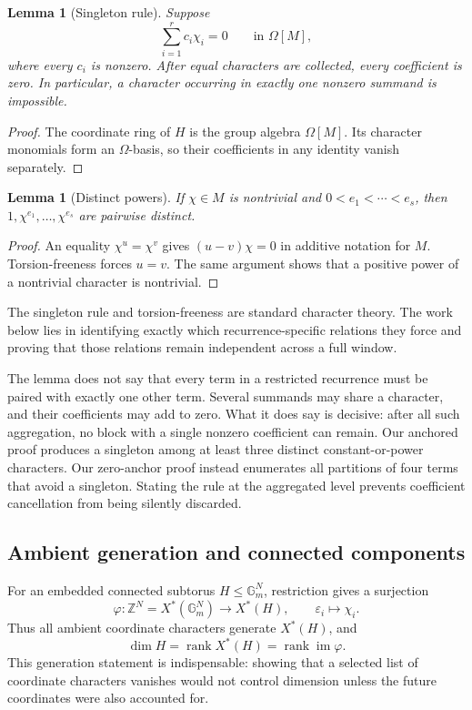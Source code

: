 \documentclass[11pt]{article}
\newtheorem{lemma}[theorem]{Lemma}
\theoremstyle{definition}
\theoremstyle{remark}
\newcommand{\Gm}{\mathbb{G}_{m}}
\newcommand{\Om}{\Omega}
\newcommand{\Z}{\mathbb{Z}}
\newcommand{\rank}{\operatorname{rank}}
\begin{document}
\begin{lemma}[Singleton rule]
\label{lem:singleton}
Suppose
\[
\sum_{i=1}^r c_i\chi_i=0\qquad\text{in }\Om[M],
\]
where every $c_i$ is nonzero.  After equal characters are collected, every coefficient is zero.  In particular, a character occurring in exactly one nonzero summand is impossible.
\end{lemma}

\begin{proof}
The coordinate ring of $H$ is the group algebra $\Om[M]$.  Its character monomials form an $\Om$-basis, so their coefficients in any identity vanish separately.
\end{proof}

\begin{lemma}[Distinct powers]
\label{lem:distinct-powers}
If $\chi\in M$ is nontrivial and $0<e_1<\cdots<e_s$, then
$1,\chi^{e_1},\ldots,\chi^{e_s}$ are pairwise distinct.
\end{lemma}

\begin{proof}
An equality $\chi^u=\chi^v$ gives $(u-v)\chi=0$ in additive notation for $M$.  Torsion-freeness forces $u=v$.  The same argument shows that a positive power of a nontrivial character is nontrivial.
\end{proof}

The singleton rule and torsion-freeness are standard character theory.  The work below lies in identifying exactly which recurrence-specific relations they force and proving that those relations remain independent across a full window.

The lemma does not say that every term in a restricted recurrence must be
paired with exactly one other term.  Several summands may share a character,
and their coefficients may add to zero.  What it does say is decisive: after
all such aggregation, no block with a single nonzero coefficient can remain.
Our anchored proof produces a singleton among at least three distinct
constant-or-power characters.  Our zero-anchor proof instead enumerates all
partitions of four terms that avoid a singleton.  Stating the rule at the
aggregated level prevents coefficient cancellation from being silently
discarded.

\subsection{Ambient generation and connected components}

For an embedded connected subtorus $H\leq\Gm^N$, restriction gives a surjection
\begin{equation}
\varphi:\Z^N=X^*(\Gm^N)\longrightarrow X^*(H),
\qquad \varepsilon_i\longmapsto\chi_i.
\label{eq:ambient-map}
\end{equation}
Thus all ambient coordinate characters generate $X^*(H)$, and
\begin{equation}
\dim H=\rank X^*(H)=\rank\operatorname{im}\varphi.
\label{eq:dimension-rank}
\end{equation}
This generation statement is indispensable: showing that a selected list of coordinate characters vanishes would not control dimension unless the future coordinates were also accounted for.
\end{document}
